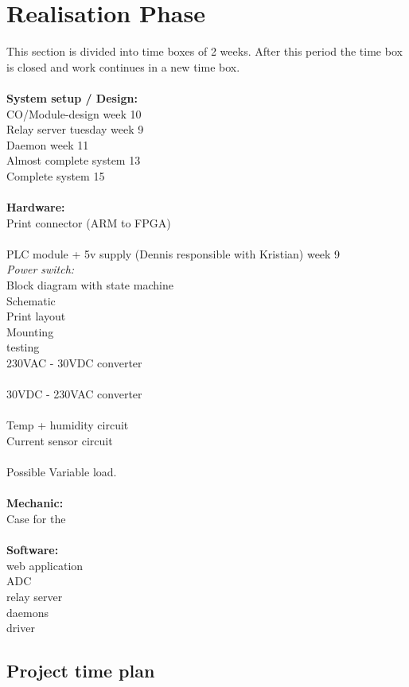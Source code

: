 \chapter{Realisation Phase}
This section is divided into time boxes of 2 weeks. After this period the time box is closed and work continues in a new time box.\\
\\
\textbf{System setup / Design:}\\
CO/Module-design week 10\\
Relay server tuesday week 9\\
Daemon week 11\\
Almost complete system 13\\
Complete system 15\\
\\
\textbf{Hardware:}\\
Print connector (ARM to FPGA)\\
\\
PLC module + 5v supply (Dennis responsible with Kristian) week 9\\
\textit{Power switch:}\\
	Block diagram with state machine\\
	Schematic\\
	Print layout\\
	Mounting\\
	testing\\
230VAC - 30VDC converter\\
\\
30VDC - 230VAC converter\\
\\
Temp + humidity circuit\\
Current sensor circuit\\
\\
Possible Variable load.\\
\\
\textbf{Mechanic:}\\
Case for the \\
\\
\textbf{Software:}\\
web application\\
ADC\\
relay server\\
daemons\\
driver\\


\section{Project time plan}







